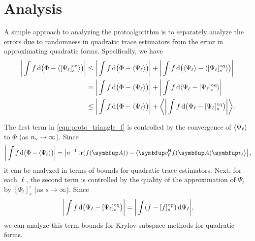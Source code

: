 \section{Analysis}

A simple approach to analyzing the protoalgorithm is to separately analyze the errors due to randomness in quadratic trace estimators from the error in approximating quadratic forms. 
Specifically, we have
\begin{align}
    \bigg| \int f \,\d\big(\Phi - \samp{\qq{\Psi_\ell}{s}}\big) \bigg|
    &\leq 
    \bigg| \int f \,\d\big(\Phi - \samp{\Psi_\ell}\big) \bigg|
    + \bigg| \int f \,\d\big(\samp{\Psi_\ell} - \samp{\qq{\Psi_\ell}{s}}\big) \bigg|
    \nonumber
    \\&=
    \bigg| \int f \,\d\big(\Phi - \samp{\Psi_\ell}\big) \bigg|
    + \bigg| \int f \,\d\samp{\Psi_\ell - \qq{\Psi_\ell}{s}} \bigg|
    \nonumber
    \\&\leq
    \bigg| \int f \,\d\big(\Phi - \samp{\Psi_\ell}\big) \bigg|
    + \samp[\bigg]{ \bigg| \int f \,\d\big(\Psi_\ell - \qq{\Psi_\ell}{s}\big) \bigg| }.
    \label{eqn:proto_triangle_f}
\end{align}

The first term in \cref{eqn:proto_triangle_f} is controlled by the convergence of \( \langle \Psi_{\ell} \rangle \) to \( \Phi \) (as \( n_{\textup{v}} \to \infty \)). 
Since
\begin{equation*}
    \bigg| \int f \,\d\big(\Phi - \samp{\Psi_\ell}\big) \bigg|
    =
    \left| n^{-1} \tr(\fA) - \samp{ \vec{v}_{\ell}^\cT \fA \vec{v}_\ell } \right|,
\end{equation*}
it can be analyzed in terms of bounds for quadratic trace estimators. 
Next, for each \( \ell \), the second term is controlled by the quality of the approximation of \( \Psi_{\ell} \) by \( [\Psi_{\ell}]_s^\circ \) (as \( s \to\infty \)).
Since
\begin{equation*}
    \bigg| \int f \,\d\big(\Psi_\ell - \qq{\Psi_\ell}{s}\big) \bigg|
    = 
    \bigg| \int (f - \ff{f}{s})  \,\d \Psi_\ell\bigg|,
\end{equation*}
we can analyze this term bounds for Krylov subspace methods for quadratic forms.


